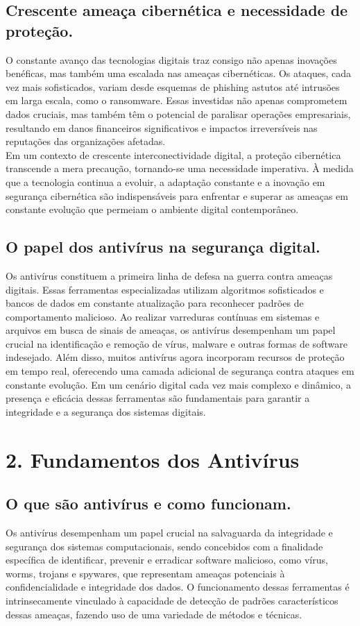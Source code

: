 \documentclass[10pt,conference,twocolumn]{article}
\begin{document}
\subsection*{ Crescente ameaça cibernética e necessidade de proteção.}
O constante avanço das tecnologias digitais traz consigo não apenas inovações benéficas, mas também uma escalada nas ameaças cibernéticas. Os ataques, cada vez mais sofisticados, variam desde esquemas de phishing astutos até intrusões em larga escala, como o ransomware. Essas investidas não apenas comprometem dados cruciais, mas também têm o potencial de paralisar operações empresariais, resultando em danos financeiros significativos e impactos irreversíveis nas reputações das organizações afetadas.\\
Em um contexto de crescente interconectividade digital, a proteção cibernética transcende a mera precaução, tornando-se uma necessidade imperativa. À medida que a tecnologia continua a evoluir, a adaptação constante e a inovação em segurança cibernética são indispensáveis para enfrentar e superar as ameaças em constante evolução que permeiam o ambiente digital contemporâneo.

\subsection*{ O papel dos antivírus na segurança digital.}
Os antivírus constituem a primeira linha de defesa na guerra contra ameaças digitais. Essas ferramentas especializadas utilizam algoritmos sofisticados e bancos de dados em constante atualização para reconhecer padrões de comportamento malicioso. Ao realizar varreduras contínuas em sistemas e arquivos em busca de sinais de ameaças, os antivírus desempenham um papel crucial na identificação e remoção de vírus, malware e outras formas de software indesejado. Além disso, muitos antivírus agora incorporam recursos de proteção em tempo real, oferecendo uma camada adicional de segurança contra ataques em constante evolução. Em um cenário digital cada vez mais complexo e dinâmico, a presença e eficácia dessas ferramentas são fundamentais para garantir a integridade e a segurança dos sistemas digitais.

\section* {2. Fundamentos dos Antivírus}

\subsection*{ O que são antivírus e como funcionam.}
Os antivírus desempenham um papel crucial na salvaguarda da integridade e segurança dos sistemas computacionais, sendo concebidos com a finalidade específica de identificar, prevenir e erradicar software malicioso, como vírus, worms, trojans e spywares, que representam ameaças potenciais à confidencialidade e integridade dos dados. O funcionamento dessas ferramentas é intrinsecamente vinculado à capacidade de detecção de padrões característicos dessas ameaças, fazendo uso de uma variedade de métodos e técnicas.
\end{document}
